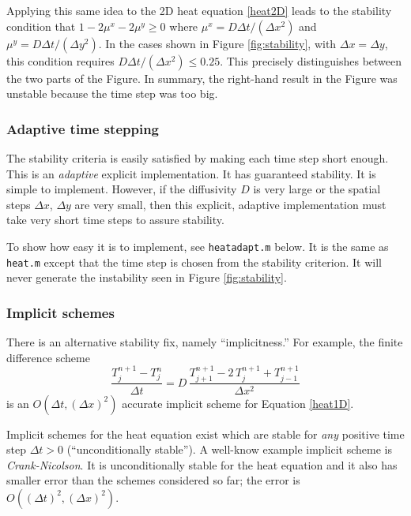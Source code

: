 \documentclass[titlepage,letterpaper,final,12pt]{scrartcl}
\newcommand{\minput}[1]{
\bigskip
\begin{quote}
\bigskip
\VerbatimInput[frame=single,framesep=3mm,label=\fbox{\normalsize \textsl{\,#1.m\,}},fontfamily=courier,fontsize=\scriptsize]{../mfiles/#1.slim.m}
\bigskip
\end{quote}
}
\begin{document}
Applying this same idea to the 2D heat equation \eqref{heat2D} leads to the stability condition that $1-2\mu^x-2\mu^y \ge 0$ where $\mu^x = D \Delta t / (\Delta x^2)$ and $\mu^y = D \Delta t / (\Delta y^2)$.  In the cases shown in Figure  \ref{fig:stability}, with $\Delta x=\Delta y$, this condition requires $D \Delta t /(\Delta x^2) \le 0.25$.  This precisely distinguishes between the two parts of the Figure.  In summary, the right-hand result in the Figure was unstable because the time step was too big.

\subsubsection*{Adaptive time stepping}

The stability criteria is easily satisfied by making each time step short enough.  This is an \textsl{adaptive} explicit implementation.  It has guaranteed stability.  It is simple to implement.  However, if the diffusivity $D$ is very large or the spatial steps $\Delta x$, $\Delta y$ are very small, then this explicit, adaptive implementation must take very short time steps to assure stability.

To show how easy it is to implement, see \texttt{heatadapt.m} below.  It is the same as \texttt{heat.m} except that the time step is chosen from the stability criterion.  It will never generate the instability seen in Figure \ref{fig:stability}.

\minput{heatadapt}

\subsubsection*{Implicit schemes}

There is an alternative stability fix, namely ``implicitness.''  For example, the finite difference scheme
   $$\frac{T_j^{n+1} - T_j^n}{\Delta t} = D\,\frac{T_{j+1}^{n+1} - 2\, T_j^{n+1} + T_{j-1}^{n+1}}{\Delta x^2}$$
is an $O(\Delta t,(\Delta x)^2)$ accurate implicit scheme for Equation \eqref{heat1D}.

Implicit schemes for the heat equation exist which are stable for \emph{any} positive time step $\Delta t>0$ (``unconditionally stable'').  A well-know example implicit scheme is \emph{Crank-Nicolson}.  It is unconditionally stable for the heat equation and it also has smaller error than the schemes considered so far; the error is $O((\Delta t)^2,(\Delta x)^2)$.
\end{document}

